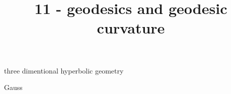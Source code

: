 \documentclass{article}
\title{11 - geodesics and geodesic curvature}
\newenvironment{andrew_section}[1]
    {
    \section{#1}
    \begin{itemize}
    }
    {
    \end{itemize}
    }
\begin{document}
\maketitle

\begin{andrew_section}{three dimentional hyperbolic geometry}
    \item 
        Gauss
\end{andrew_section}
\end{document}
